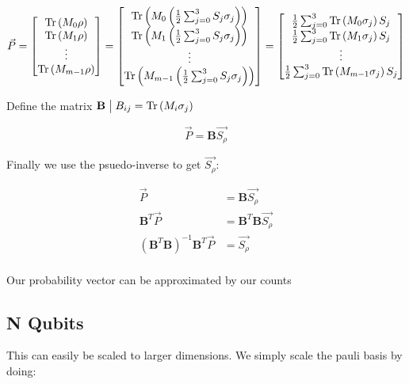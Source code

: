 \documentclass{article}
\begin{document}
$$\vec{P} 
= \begin{bmatrix} \operatorname{Tr}\left(M_0\rho\right) \\ \operatorname{Tr}\left(M_1\rho\right) \\ \vdots \\ \operatorname{Tr}\left(M_{m-1}\rho\right) \end{bmatrix}
= \begin{bmatrix} 
\operatorname{Tr}\left(M_0\left(\frac{1}{2}\sum_{j=0}^3 S_j \sigma_j\right)\right) \\
\operatorname{Tr}\left(M_1\left(\frac{1}{2}\sum_{j=0}^3 S_j \sigma_j\right)\right) \\ 
\vdots \\ 
\operatorname{Tr}\left(M_{m-1}\left(\frac{1}{2}\sum_{j=0}^3 S_j \sigma_j\right)\right) 
\end{bmatrix}
= \begin{bmatrix} 
\frac{1}{2}\sum_{j=0}^3\operatorname{Tr}\left(M_0\sigma_j\right)S_j \\
\frac{1}{2}\sum_{j=0}^3\operatorname{Tr}\left(M_1\sigma_j\right)S_j \\ 
\vdots \\ 
\frac{1}{2}\sum_{j=0}^3\operatorname{Tr}\left(M_{m-1}\sigma_j\right) S_j
\end{bmatrix}$$

Define the matrix $\textbf{B} \;\big|\; B_{ij} = \operatorname{Tr}\left(M_i\sigma_j\right)$

$$\vec{P} = \textbf{B} \vec{S_{\rho}}$$

Finally we use the psuedo-inverse to get $\vec{S_{\rho}}$:

$$
\begin{aligned}
\vec{P} &= \textbf{B} \vec{S_{\rho}} \\
\textbf{B}^T\vec{P} &= \textbf{B}^T\textbf{B} \vec{S_{\rho}} \\
(\textbf{B}^T\textbf{B})^{-1}\textbf{B}^T\vec{P} &= \vec{S_{\rho}} \\
\end{aligned}
$$

Our probability vector can be approximated by our counts
\subsection{N Qubits}
This can easily be scaled to larger dimensions. We simply scale the pauli basis by doing:
\end{document}
